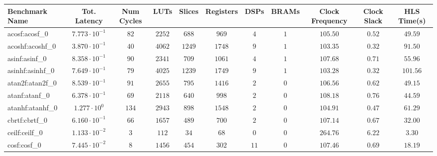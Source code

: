 \begin{tabular}{|l|c|c|c|c|c|c|c|c|c|c|}
\hline
Benchmark Name               & Tot. Latency            & Num Cycles & LUTs      & Slices    & Registers & DSPs    & BRAMs & Clock Frequency & Clock Slack & HLS Time(s) \\
\hline
acosf:acosf\_0               & $ 7.773 \cdot 10^{-1} $ & $ 82     $ & $ 2252  $ & $ 688   $ & $ 969   $ & $ 4   $ & $ 1 $ & $ 105.50      $ & $ 0.52    $ & $ 49.59   $ \\
acoshf:acoshf\_0             & $ 3.870 \cdot 10^{-1} $ & $ 40     $ & $ 4062  $ & $ 1249  $ & $ 1748  $ & $ 9   $ & $ 1 $ & $ 103.35      $ & $ 0.32    $ & $ 91.50   $ \\
asinf:asinf\_0               & $ 8.358 \cdot 10^{-1} $ & $ 90     $ & $ 2341  $ & $ 709   $ & $ 1061  $ & $ 4   $ & $ 1 $ & $ 107.68      $ & $ 0.71    $ & $ 55.96   $ \\
asinhf:asinhf\_0             & $ 7.649 \cdot 10^{-1} $ & $ 79     $ & $ 4025  $ & $ 1239  $ & $ 1749  $ & $ 9   $ & $ 1 $ & $ 103.28      $ & $ 0.32    $ & $ 101.56  $ \\
atan2f:atan2f\_0             & $ 8.539 \cdot 10^{-1} $ & $ 91     $ & $ 2655  $ & $ 795   $ & $ 1416  $ & $ 2   $ & $ 0 $ & $ 106.56      $ & $ 0.62    $ & $ 49.15   $ \\
atanf:atanf\_0               & $ 6.378 \cdot 10^{-1} $ & $ 69     $ & $ 2118  $ & $ 640   $ & $ 998   $ & $ 2   $ & $ 0 $ & $ 108.18      $ & $ 0.76    $ & $ 44.59   $ \\
atanhf:atanhf\_0             & $ 1.277 \cdot 10^{0}  $ & $ 134    $ & $ 2943  $ & $ 898   $ & $ 1548  $ & $ 2   $ & $ 0 $ & $ 104.91      $ & $ 0.47    $ & $ 61.29   $ \\
cbrtf:cbrtf\_0               & $ 6.160 \cdot 10^{-1} $ & $ 66     $ & $ 1657  $ & $ 489   $ & $ 700   $ & $ 2   $ & $ 0 $ & $ 107.14      $ & $ 0.67    $ & $ 32.00   $ \\
ceilf:ceilf\_0               & $ 1.133 \cdot 10^{-2} $ & $ 3      $ & $ 112   $ & $ 34    $ & $ 68    $ & $ 0   $ & $ 0 $ & $ 264.76      $ & $ 6.22    $ & $ 3.30    $ \\
cosf:cosf\_0                 & $ 7.445 \cdot 10^{-2} $ & $ 8      $ & $ 1456  $ & $ 454   $ & $ 302   $ & $ 11  $ & $ 0 $ & $ 107.46      $ & $ 0.69    $ & $ 18.19   $ \\

\end{tabular}
